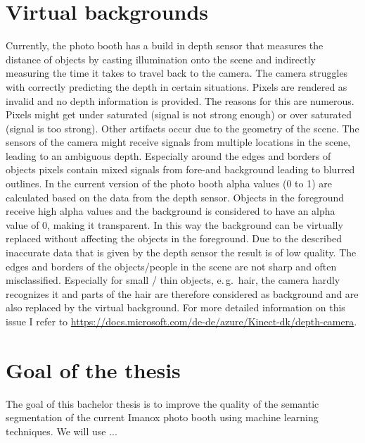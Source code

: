 \documentclass[11pt,
  paper=a4, 
  bibliography=totocnumbered,
	captions=tableheading,
	BCOR=10mm
]{scrreprt}
\theoremstyle{definition}
\newcommand{\eg}{e.\,g.~}
\begin{document}
\section{Virtual backgrounds}
Currently, the photo booth has a build in depth sensor that measures the distance of objects by casting illumination onto the scene and indirectly measuring the time it takes to travel back to the camera. 
The camera struggles with correctly predicting the depth in certain situations. 
Pixels are rendered as invalid and no depth information is provided. 
The reasons for this are numerous. 
Pixels might get under saturated (signal is not strong enough) or over saturated (signal is too strong). 
Other artifacts occur due to the geometry of the scene. 
The sensors of the camera might receive signals from multiple locations in the scene, leading to an ambiguous depth. 
Especially around the edges and borders of objects pixels contain mixed signals from fore-and background leading to blurred outlines.
In the current version of the photo booth alpha values (0 to 1) are calculated based on the data from the depth sensor. 
Objects in the foreground receive high alpha values and the background is considered to have an alpha value of 0, making it transparent. 
In this way the background can be virtually replaced without affecting the objects in the foreground. 
Due to the described inaccurate data that is given by the depth sensor the result is of low quality. 
The edges and borders of the objects/people in the scene are not sharp and often misclassified. 
Especially for small / thin objects, \eg hair, the camera hardly recognizes it and parts of the hair are therefore considered as background and are also replaced by the virtual background.
For more detailed information on this issue I refer to \url{https://docs.microsoft.com/de-de/azure/Kinect-dk/depth-camera}.
\cite{Microsoft2019}

\section{Goal of the thesis}
The goal of this bachelor thesis is to improve the quality of the semantic segmentation of the current Imanox photo booth using machine learning techniques.
We will use ...
\end{document}
